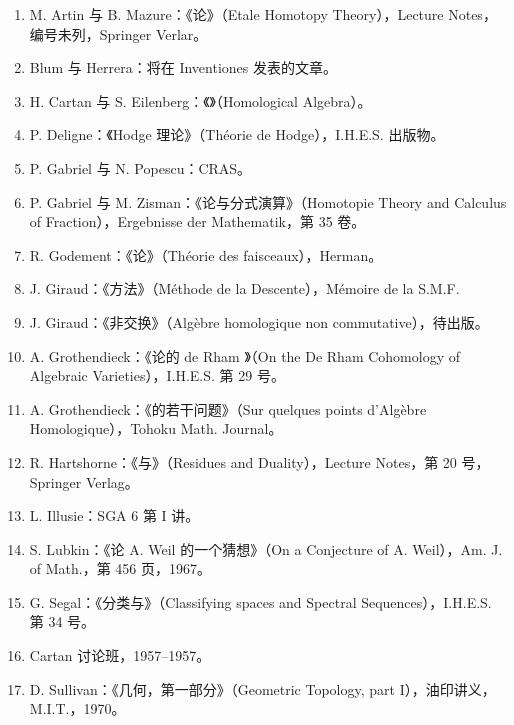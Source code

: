 \begin{enumerate}
\item[{[1]}] M. Artin 与 B. Mazure：《论》（Etale Homotopy Theory），Lecture Notes，编号未列，Springer Verlar。
\item[{[2]}] Blum 与 Herrera：将在 Inventiones 发表的文章。
\item[{[3]}] H. Cartan 与 S. Eilenberg：《》（Homological Algebra）。
\item[{[4]}] P. Deligne：《Hodge 理论》（Théorie de Hodge），I.H.E.S. 出版物。
\item[{[5]}] P. Gabriel 与 N. Popescu：CRAS。
\item[{[6]}] P. Gabriel 与 M. Zisman：《论与分式演算》（Homotopie Theory and Calculus of Fraction），Ergebnisse der Mathematik，第 35 卷。
\item[{[7]}] R. Godement：《论》（Théorie des faisceaux），Herman。
\item[{[8]}] J. Giraud：《方法》（Méthode de la Descente），Mémoire de la S.M.F.
\item[{[9]}] J. Giraud：《非交换》（Algèbre homologique non commutative），待出版。
\item[{[10]}] A. Grothendieck：《论的 de Rham 》（On the De Rham Cohomology of Algebraic Varieties），I.H.E.S. 第 29 号。
\item[{[11]}] A. Grothendieck：《的若干问题》（Sur quelques points d'Algèbre Homologique），Tohoku Math. Journal。
\item[{[12]}] R. Hartshorne：《与》（Residues and Duality），Lecture Notes，第 20 号，Springer Verlag。
\item[{[13]}] L. Illusie：SGA 6 第 I 讲。
\item[{[14]}] S. Lubkin：《论 A. Weil 的一个猜想》（On a Conjecture of A. Weil），Am. J. of Math.，第 456 页，1967。
\item[{[15]}] G. Segal：《分类与》（Classifying spaces and Spectral Sequences），I.H.E.S. 第 34 号。
\item[{[16]}] Cartan 讨论班，1957--1957。
\item[{[17]}] D. Sullivan：《几何，第一部分》（Geometric Topology, part I），油印讲义，M.I.T.，1970。
\end{enumerate}
